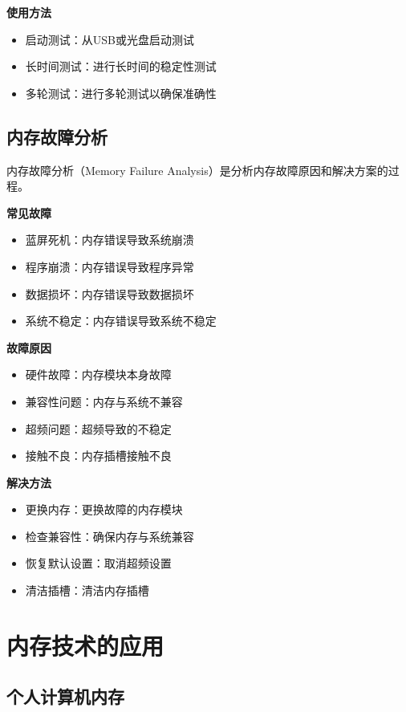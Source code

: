 \documentclass{article}
\begin{document}
\textbf{使用方法}
\begin{itemize}
    \item 启动测试：从USB或光盘启动测试
    \item 长时间测试：进行长时间的稳定性测试
    \item 多轮测试：进行多轮测试以确保准确性
\end{itemize}

\subsection{内存故障分析}

内存故障分析（Memory Failure Analysis）是分析内存故障原因和解决方案的过程。

\textbf{常见故障}
\begin{itemize}
    \item 蓝屏死机：内存错误导致系统崩溃
    \item 程序崩溃：内存错误导致程序异常
    \item 数据损坏：内存错误导致数据损坏
    \item 系统不稳定：内存错误导致系统不稳定
\end{itemize}

\textbf{故障原因}
\begin{itemize}
    \item 硬件故障：内存模块本身故障
    \item 兼容性问题：内存与系统不兼容
    \item 超频问题：超频导致的不稳定
    \item 接触不良：内存插槽接触不良
\end{itemize}

\textbf{解决方法}
\begin{itemize}
    \item 更换内存：更换故障的内存模块
    \item 检查兼容性：确保内存与系统兼容
    \item 恢复默认设置：取消超频设置
    \item 清洁插槽：清洁内存插槽
\end{itemize}

\section{内存技术的应用}

\subsection{个人计算机内存}
\end{document}
